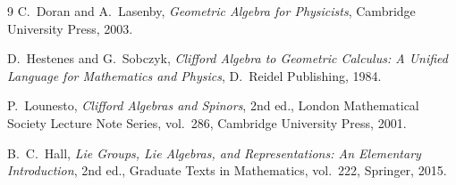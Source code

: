 \documentclass[11pt]{article}
\theoremstyle{definition}
\begin{document}
\begin{thebibliography}{9}
C.~Doran and A.~Lasenby, \emph{Geometric Algebra for Physicists}, Cambridge University Press,
2003.

D.~Hestenes and G.~Sobczyk, \emph{Clifford Algebra to Geometric Calculus: A Unified Language
for Mathematics and Physics}, D.~Reidel Publishing, 1984.

P.~Lounesto, \emph{Clifford Algebras and Spinors}, 2nd ed., London Mathematical Society Lecture
Note Series, vol.~286, Cambridge University Press, 2001.

B.~C.~Hall, \emph{Lie Groups, Lie Algebras, and Representations: An Elementary Introduction},
2nd ed., Graduate Texts in Mathematics, vol.~222, Springer, 2015.
\end{thebibliography}
\end{document}

